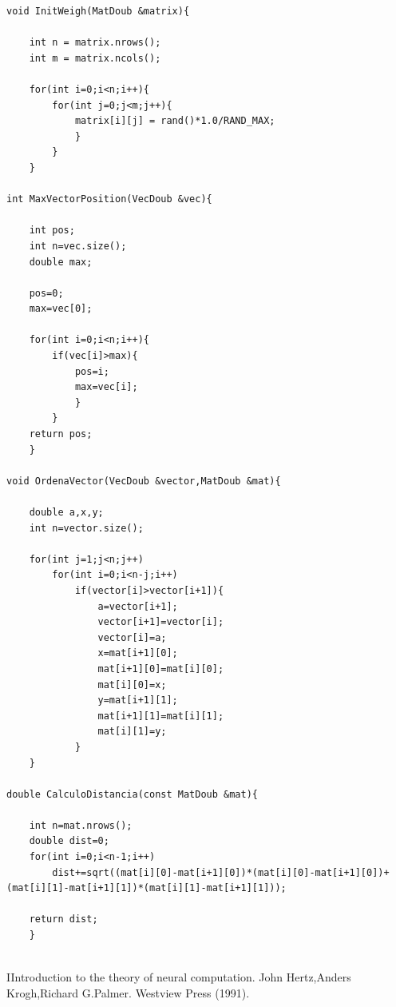 \documentclass[aps,prb,onecolumn,10pt,floatfix,superscriptaddress]{article} %
\begin{document}
\begin{lstlisting}[frame=single,breaklines=true]
void InitWeigh(MatDoub &matrix){
	
	int n = matrix.nrows();
	int m = matrix.ncols();
	
	for(int i=0;i<n;i++){
		for(int j=0;j<m;j++){
			matrix[i][j] = rand()*1.0/RAND_MAX;
			}
		}
	}
	
int MaxVectorPosition(VecDoub &vec){
	
	int pos;
	int n=vec.size();
	double max;
	
	pos=0;
	max=vec[0];
	
	for(int i=0;i<n;i++){
		if(vec[i]>max){
			pos=i;
			max=vec[i];
			}
		}
	return pos;
	}
	
void OrdenaVector(VecDoub &vector,MatDoub &mat){
	
	double a,x,y;
	int n=vector.size();
	
	for(int j=1;j<n;j++)
		for(int i=0;i<n-j;i++)
			if(vector[i]>vector[i+1]){
				a=vector[i+1];
				vector[i+1]=vector[i];
				vector[i]=a;
				x=mat[i+1][0];
				mat[i+1][0]=mat[i][0];
				mat[i][0]=x;
				y=mat[i+1][1];
				mat[i+1][1]=mat[i][1];
				mat[i][1]=y;
			}
	}
	
double CalculoDistancia(const MatDoub &mat){
	
	int n=mat.nrows();
	double dist=0;
	for(int i=0;i<n-1;i++)
		dist+=sqrt((mat[i][0]-mat[i+1][0])*(mat[i][0]-mat[i+1][0])+(mat[i][1]-mat[i+1][1])*(mat[i][1]-mat[i+1][1]));

	return dist;
	}


\end{lstlisting}


\begin{thebibliography}{99}

\bibitem IIntroduction to the theory of neural computation. John Hertz,Anders Krogh,Richard G.Palmer. Westview Press (1991).

\end{thebibliography}
\end{document}
